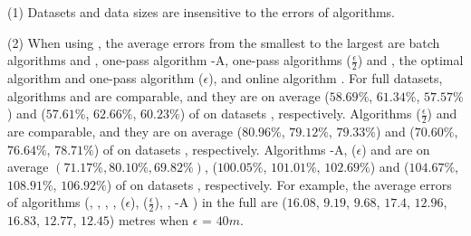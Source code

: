 \sstab (1) {Datasets {and data sizes} are insensitive to the errors of \lsa algorithms.}

\sstab (2) When using \ped, the average errors from the smallest
to the largest are batch algorithms \tpa and \dpa, one-pass
algorithm {\operb-A}, one-pass
algorithms \siped($\frac{\epsilon}{2}$) and \operb, the optimal algorithm \opt and one-pass algorithm \siped(${\epsilon}$), and online algorithm \bqsa.
%
For full datasets, algorithms \tpa and \dpa are comparable, and they are on average ($58.69\%$, $61.34\%$,
$57.57\%$) and ($57.61\%$, $62.66\%$, $60.23\%$) of \opt on datasets \dSets, respectively.
Algorithms \siped($\frac{\epsilon}{2}$) and \operb are comparable, and they are on average
($80.96\%$, $79.12\%$, $79.33\%$) and ($70.60\%$, $76.64\%$, $78.71\%$) of \opt on datasets \dSets, respectively.
%
Algorithms {\operb-A}, \siped(${\epsilon}$) and \bqsa are on average {$(71.17\%, 80.10\%, 69.82\%)$}, ($100.05\%$, $101.01\%$, $102.69\%$) and ($104.67\%$, $108.91\%$, $106.92\%$) of \opt on datasets \dSets, respectively.
For example, the average errors of algorithms
(\opt, \tpa, \dpa, \bqsa, \siped(${\epsilon}$), \siped($\frac{\epsilon}{2}$), \operb, {\operb-A} ) in the full \mopsi are ($16.08$, $9.19$, $9.68$, $17.4$, $12.96$, $16.83$, $12.77$, {$12.45$}) metres when $\epsilon$ = $40m$.


